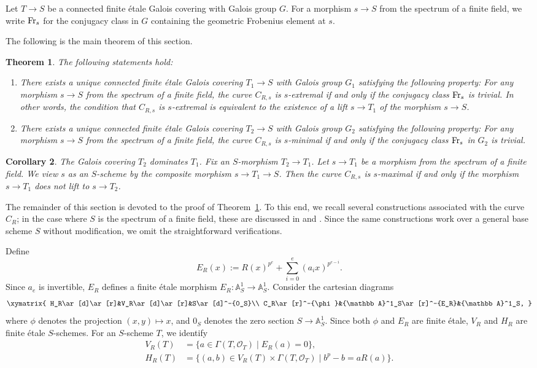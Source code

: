 \documentclass[12pt,a4paper]{amsart}
\newtheorem{theorem}{Theorem}[section]
\newtheorem{corollary}[theorem]{Corollary}
\theoremstyle{definition}
\def\A{{\mathbb A}}
\theoremstyle{remark}
\begin{document}
Let $T\to S$ be a connected finite \'etale Galois covering with Galois group $G$. For a morphism $s\to S$ from the spectrum of a finite field, we write ${\rm Fr}_s$ for 
the conjugacy class in $G$ containing the geometric Frobenius element at $s$. 


The following is the main theorem of this section. 
\begin{theorem}\label{T_12}
The following statements hold: 
\begin{enumerate}
\item 
There exists a unique connected finite \'etale Galois covering $T_1\to S$ with Galois group $G_1$ satisfying the following property: For any morphism $s\to S$ from the spectrum of a finite field, 
the curve $C_{R,s}$ is $s$-extremal if and only if 
the conjugacy class ${\rm Fr}_s$ is trivial. In other words, the condition that $C_{R,s}$ is $s$-extremal is equivalent to the existence of a lift $s\to T_1$ of the morphism $s\to S$.  

\item There exists a unique connected finite \'etale Galois covering $T_2\to S$ with Galois group $G_2$ satisfying the following property: For any morphism $s\to S$ from the spectrum of a finite field, 
the curve $C_{R,s}$ is $s$-minimal  if and only if 
the conjugacy class ${\rm Fr}_s$ in $G_2$ is trivial. 
\end{enumerate}
\end{theorem}

\begin{corollary}\label{T2 dominates T1}
 The Galois covering $T_2$ dominates $T_1$. Fix an $S$-morphism $T_2\to T_1$. Let $s\to T_1$ be a morphism from the spectrum of a finite field. We view $s$ as an $S$-scheme by the composite morphism $s\to T_1\to S$. Then the curve $C_{R,s}$ is $s$-maximal if and only if the morphism $s\to T_1$ does not lift to $s\to T_2$. 
\end{corollary}

The remainder of this section is devoted to the proof of Theorem~\ref{T_12}. 
To this end, we recall several constructions associated with the curve $C_R$; in the case where $S$ is the spectrum of a finite field, these are discussed in  \cite[\S2.2]{ITT0} and \cite[\S2.1]{TT}. Since the same constructions work over a general base scheme $S$ without modification, we omit the straightforward verifications. 


Define 
\[
 E_R(x):=R(x)^{p^e}+\sum_{i=0}^e(a_ix)^{p^{e-i}}. 
\]
Since $a_e$ is invertible, $E_R$ defines a finite \'etale morphism $E_R\colon \A^1_S\to \A^1_S$. Consider the cartesian diagrams 
\[
\xymatrix{
H_R\ar[d]\ar[r]&V_R\ar[d]\ar[r]&S\ar[d]^-{0_S}\\
C_R\ar[r]^-{\phi}&\A^1_S\ar[r]^-{E_R}&\A^1_S, 
}
\]
where $\phi$ denotes the projection $(x,y)\mapsto x$, and $0_S$ denotes the zero section $S\to \A^1_S$. Since both $\phi$ and $E_R$ are finite \'etale, $V_R$ and $H_R$ are finite \'etale $S$-schemes. 
For an $S$-scheme $T$, we identify 
\begin{align*}
   V_R(T)&=\{a\in\Gamma(T,\mathcal{O}_T)\mid E_R(a)=0\},\\
H_R(T)&=\{(a,b)\in V_R(T)\times \Gamma(T,\mathcal{O}_T)\mid b^p-b=aR(a)\}. 
\end{align*}
 
\end{document}
